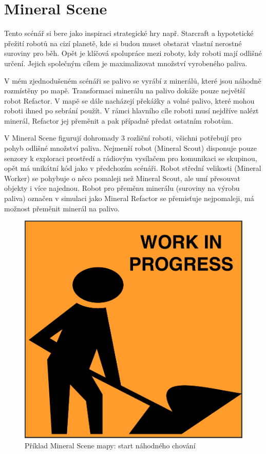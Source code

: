 \section{Mineral Scene}
Tento scénář si bere jako inspiraci strategické hry např. Starcraft \citep*{starcraft} a hypotetické přežití robotů na cizí planetě, kde si budou muset obstarat vlastní nerostné suroviny pro běh. Opět je klíčová spolupráce mezi roboty, kdy roboti mají odlišné určení. Jejich společným cílem je maximalizovat množství vyrobeného paliva.
\par 
V mém zjednodušeném scénáři se palivo se vyrábí z minerálů, které jsou náhodně rozmístěny po mapě. Transformaci minerálu na palivo dokáže pouze největší robot Refactor. V mapě se dále nacházejí překážky a volné palivo, které mohou roboti ihned po sebrání použít. V rámci hlavního cíle roboti musí nejdříve nalézt minerál, Refactor jej přeměnit a pak případně předat ostatním robotům. 
\par
V Mineral Scene figurují dohromady 3 rozliční roboti, všichni potřebují pro pohyb odlišné množství paliva. Nejmenší robot (Mineral Scout) disponuje pouze senzory k exploraci prostředí a rádiovým vysílačem pro komunikaci se skupinou, opět má unikátní kód  jako v předchozím scénáři. Robot střední velikosti (Mineral Worker) se pohybuje o něco pomaleji než Mineral Scout, ale umí přesouvat objekty i více najednou. Robot pro přeměnu minerálu (suroviny na výrobu paliva) označen v simulaci jako Mineral Refactor se přemisťuje nejpomaleji, má možnost přeměnit minerál na palivo. 
\clearpage

\begin{figure}[p]\centering
	\includegraphics[width=\columnwidth]{../img/todo}
	\caption{Příklad Mineral Scene mapy: start náhodného chování}
	\label{obr04:MineralSceneRandomStart}
\end{figure}
\clearpage 
